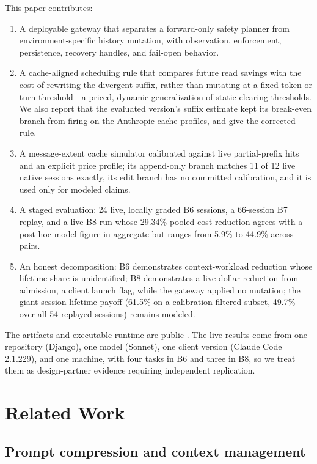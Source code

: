 \documentclass[10pt,twocolumn]{article}
\begin{document}
This paper contributes:

\begin{enumerate}
  \item A deployable gateway that separates a forward-only safety planner from environment-specific
  history mutation, with observation, enforcement, persistence, recovery handles, and fail-open
  behavior.
  \item A cache-aligned scheduling rule that compares future read savings with the cost of rewriting
  the divergent suffix, rather than mutating at a fixed token or turn threshold---a priced, dynamic
  generalization of static clearing thresholds.  We also report that the evaluated version's suffix
  estimate kept its break-even branch from firing on the Anthropic cache profiles, and give the
  corrected rule.
  \item A message-extent cache simulator calibrated against live partial-prefix hits and an explicit
  price profile; its append-only branch matches 11 of 12 live native sessions exactly, its edit branch
  has no committed calibration, and it is used only for modeled claims.
  \item A staged evaluation: 24 live, locally graded B6 sessions, a 66-session B7 replay, and a live B8
  run whose 29.34\% pooled cost reduction agrees with a post-hoc model figure in aggregate but ranges
  from 5.9\% to 44.9\% across pairs.
  \item An honest decomposition: B6 demonstrates context-workload reduction whose lifetime share is
  unidentified; B8 demonstrates a live dollar reduction from admission, a client launch flag, while the
  gateway applied no mutation; the giant-session lifetime payoff (61.5\% on a calibration-filtered
  subset, 49.7\% over all 54 replayed sessions) remains modeled.
\end{enumerate}

The artifacts and executable runtime are public \cite{contextruntime2026}.  The live results come from
one repository (Django), one model (Sonnet), one client version (Claude Code 2.1.229), and one machine, with
four tasks in B6 and three in B8, so we treat them as design-partner evidence requiring independent
replication.

\section{Related Work}

\subsection{Prompt compression and context management}
\end{document}
